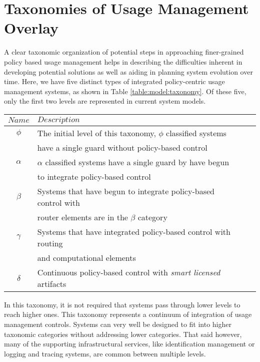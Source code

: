 \section{Taxonomies of Usage Management Overlay}
A clear taxonomic organization of potential steps in approaching finer-grained policy based usage management helps in describing the difficulties inherent in developing potential solutions as well as aiding in planning system evolution over time. Here, we have five distinct types of integrated policy-centric usage management systems, as shown in Table \ref{table:model:taxonomy}.  Of these five, only the first two levels are represented in current system models.

\begin{table*}[tp] %
\centering %
\begin{tabular}{clcc}
\toprule %
$ Name$ 	& $Description$ \\\toprule %
$\phi$ 		& The initial level of this taxonomy, $\phi$ classified systems \\
 			& have a single guard without policy-based control \\\midrule
$\alpha$	& $\alpha$ classified systems have a single guard by have begun \\
			& to integrate policy-based control \\\midrule
$\beta$		& Systems that have begun to integrate policy-based control with \\
			& router elements are in the $\beta$ category \\\midrule
$\gamma$	& Systems that have integrated policy-based control with routing \\
			& and computational elements \\\midrule
$\delta$	& Continuous policy-based control with \textit{smart licensed} artifacts \\\bottomrule
\end{tabular}
\caption{Proposed Usage Management Taxonomy}
\label{table:model:taxonomy}
\end{table*}

In this taxonomy, it is not required that systems pass through lower levels to reach higher ones.  This taxonomy represents a continuum of integration of usage management controls.  Systems can very well be designed to fit into higher taxonomic categories without addressing lower categories.  That said however, many of the supporting infrastructural services, like identification management or logging and tracing systems, are common between multiple levels.

